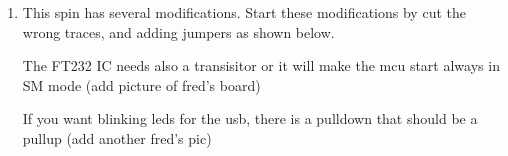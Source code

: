 \documentclass[12pt,a4paper,titlepage]{article}
\begin{document}
\begin{enumerate}
\item This spin has several modifications. Start these modifications by cut the wrong traces, and adding jumpers as shown below.

The FT232 IC needs also a transisitor or it will make the mcu start always in SM mode (add picture of fred's board)

If you want blinking leds for the usb, there is a pulldown that should be a pullup (add another  fred's pic)

\begin{figure}[htb]
  \centering
\end{figure}
\end{enumerate}
\end{document}
